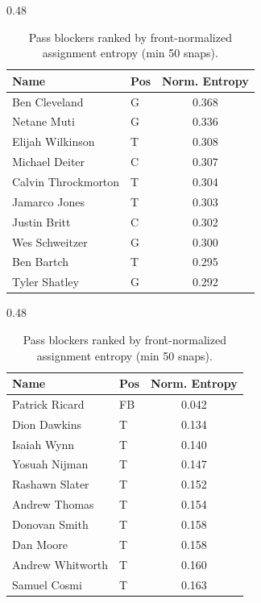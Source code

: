 \begin{table}[h!]
\centering
\begin{subtable}{0.48\textwidth}
\centering
\footnotesize
\begin{tabular}{llc}
\toprule
Name & Pos & Norm. Entropy \\
\midrule
Ben Cleveland & G & 0.368 \\
Netane Muti & G & 0.336 \\
Elijah Wilkinson & T & 0.308 \\
Michael Deiter & C & 0.307 \\
Calvin Throckmorton & T & 0.304 \\
Jamarco Jones & T & 0.303 \\
Justin Britt & C & 0.302 \\
Wes Schweitzer & G & 0.300 \\
Ben Bartch & T & 0.295 \\
Tyler Shatley & G & 0.292 \\
\bottomrule
\end{tabular}
\caption{Highest (most switching)}
\end{subtable}
\hfill
\begin{subtable}{0.48\textwidth}
\centering
\footnotesize
\begin{tabular}{llc}
\toprule
Name & Pos & Norm. Entropy \\
\midrule
Patrick Ricard & FB & 0.042 \\
Dion Dawkins & T & 0.134 \\
Isaiah Wynn & T & 0.140 \\
Yosuah Nijman & T & 0.147 \\
Rashawn Slater & T & 0.152 \\
Andrew Thomas & T & 0.154 \\
Donovan Smith & T & 0.158 \\
Dan Moore & T & 0.158 \\
Andrew Whitworth & T & 0.160 \\
Samuel Cosmi & T & 0.163 \\
\bottomrule
\end{tabular}
\caption{Lowest (stickiest)}
\end{subtable}
\hfill
\caption{Pass blockers ranked by front-normalized assignment entropy (min 50 snaps).}
\label{tab:blocker_entropy}
\end{table}
